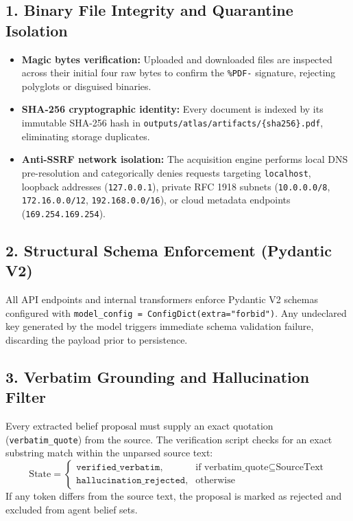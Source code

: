\documentclass[11pt,a4paper]{article}
\begin{document}
\subsection{1. Binary File Integrity and Quarantine Isolation}
\begin{itemize}[leftmargin=*]
    \item \textbf{Magic bytes verification:} Uploaded and downloaded files are inspected across their initial four raw bytes to confirm the \texttt{\%PDF-} signature, rejecting polyglots or disguised binaries.
    \item \textbf{SHA-256 cryptographic identity:} Every document is indexed by its immutable SHA-256 hash in \texttt{outputs/atlas/artifacts/\{sha256\}.pdf}, eliminating storage duplicates.
    \item \textbf{Anti-SSRF network isolation:} The acquisition engine performs local DNS pre-resolution and categorically denies requests targeting \texttt{localhost}, loopback addresses (\texttt{127.0.0.1}), private RFC 1918 subnets (\texttt{10.0.0.0/8}, \texttt{172.16.0.0/12}, \texttt{192.168.0.0/16}), or cloud metadata endpoints (\texttt{169.254.169.254}).
\end{itemize}

\subsection{2. Structural Schema Enforcement (Pydantic V2)}
All API endpoints and internal transformers enforce Pydantic V2 schemas configured with \texttt{model\_config = ConfigDict(extra="forbid")}. Any undeclared key generated by the model triggers immediate schema validation failure, discarding the payload prior to persistence.

\subsection{3. Verbatim Grounding and Hallucination Filter}
Every extracted belief proposal must supply an exact quotation (\texttt{verbatim\_quote}) from the source. The verification script checks for an exact substring match within the unparsed source text:
\begin{equation}
    \text{State} = \begin{cases}
        \texttt{verified\_verbatim}, & \text{if } \text{verbatim\_quote} \subseteq \text{SourceText} \\
        \texttt{hallucination\_rejected}, & \text{otherwise}
    \end{cases}
\end{equation}
If any token differs from the source text, the proposal is marked as rejected and excluded from agent belief sets.
\end{document}
